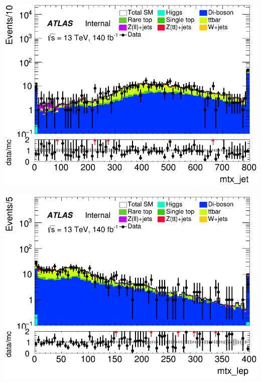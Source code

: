 \documentclass[usenames,dvipsnames]{beamer}
\begin{document}
\begin{frame}
    \begin{minipage}{0.32\textwidth}
        \centering
        \includegraphics[width=\textwidth]{graphics/LLH_met/LLH_met_mtx_jet.png}
    \end{minipage}
        \hfill
    \begin{minipage}{0.32\textwidth}
        \centering
        \includegraphics[width=\textwidth]{graphics/LLH_met/LLH_met_mtx_lep.png}
    \end{minipage}
    \hfill
    \begin{minipage}{0.32\textwidth}
        \centering

\end{minipage}
\end{frame}
\end{document}
